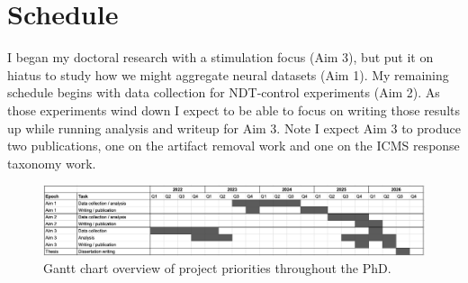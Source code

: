 \documentclass[12pt,oneside]{report}
\begin{document}
\chapter{Schedule}
I began my doctoral research with a stimulation focus (Aim 3), but put it on hiatus to study how we might aggregate neural datasets (Aim 1). My remaining schedule begins with data collection for NDT-control experiments (Aim 2). As those experiments wind down I expect to be able to focus on writing those results up while running analysis and writeup for Aim 3. Note I expect Aim 3 to produce two publications, one on the artifact removal work and one on the ICMS response taxonomy work.

\begin{figure}[h]
  \centering
  \includegraphics[width=1.0\linewidth]{ch5_schedule_gantt.png}
  \caption{Gantt chart overview of project priorities throughout the PhD.}
  \label{fig:schedule}
\end{figure}

\cleardoublepage
\printbibliography
\end{document}
